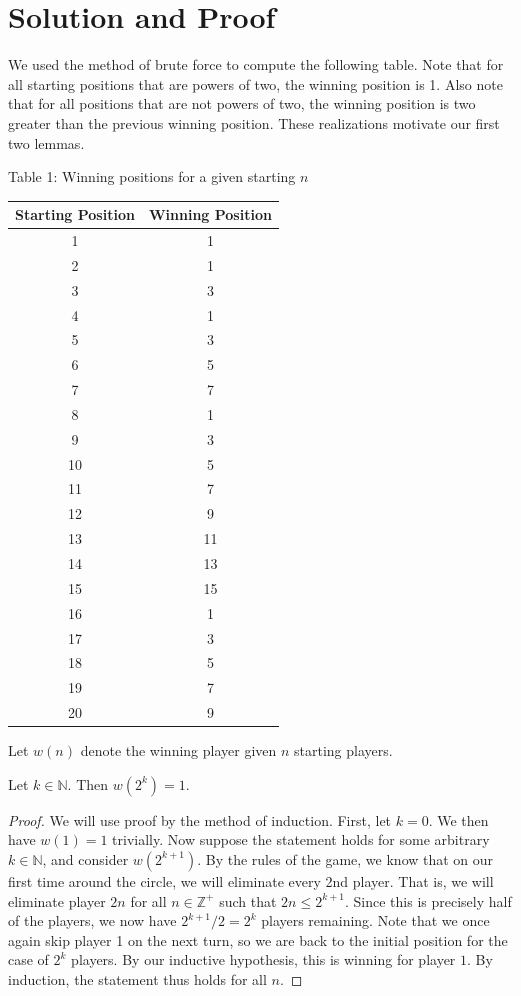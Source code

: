 \documentclass[11pt, letterpaper]{article}
\begin{document}
\section{Solution and Proof}
We used the method of brute force to compute the following table. Note that for all starting positions that are powers of two, the winning position is 1. Also note that for all positions that are not powers of two, the winning position is two greater than the previous winning position. These realizations motivate our first two lemmas.
\newpage
\begin{center}
	Table 1: Winning positions for a given starting $n$\label{tab:1}\vspace{10pt}\\
	\begin{tabular}{cc}
		\toprule
		Starting Position&Winning Position\\
		\midrule
		1&1\\
		2&1\\
		3&3\\
		4&1\\
		5&3\\
		6&5\\
		7&7\\
		8&1\\
		9&3\\
		10&5\\
		11&7\\
		12&9\\
		13&11\\
		14&13\\
		15&15\\
		16&1\\
		17&3\\
		18&5\\
		19&7\\
		20&9\\
		\bottomrule
	\end{tabular}
\end{center}
\begin{definition}\label{dfn:1}
	Let $w(n)$ denote the winning player given $n$ starting players.
\end{definition}
\begin{lemma}\label{lma:1}
	Let $k\in\mathbb{N}$. Then $w(2^k)=1$.
\end{lemma}
\begin{proof}
	We will use proof by the method of induction. First, let $k=0$. We then have $w(1)=1$ trivially. Now suppose the statement holds for some arbitrary $k\in\mathbb{N}$, and consider $w(2^{k+1})$. By the rules of the game, we know that on our first time around the circle, we will eliminate every 2nd player. That is, we will eliminate player $2n$ for all  $n\in\mathbb{Z}^+$ such that $2n\leq 2^{k+1}$. Since this is precisely half of the players, we now have $2^{k+1} / 2=2^{k}$ players remaining. Note that we once again skip player 1 on the next turn, so we are back to the initial position for the case of $2^k$ players. By our inductive hypothesis, this is winning for player $1$. By induction, the statement thus holds for all $n$.
\end{proof}
\end{document}
